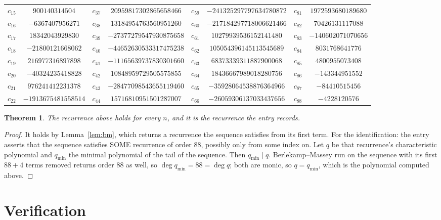 \documentclass[11pt,a4paper]{article}
\theoremstyle{plain}
\newtheorem{theorem}{Theorem}
\theoremstyle{definition}
\begin{document}
\begin{center}
\begin{tabular}{cccccccc}
$c_{15}$ & $900140314504$ & $c_{37}$ & $20959817302865658466$ & $c_{59}$ & $-241325297797634780872$ & $c_{81}$ & $1972593680189680$ \\
$c_{16}$ & $-6367407956271$ & $c_{38}$ & $13184954763560951260$ & $c_{60}$ & $-217184297718006621466$ & $c_{82}$ & $70426131117088$ \\
$c_{17}$ & $18342043929830$ & $c_{39}$ & $-27377279547930875658$ & $c_{61}$ & $10279939536152141480$ & $c_{83}$ & $-140602071070656$ \\
$c_{18}$ & $-21800121668062$ & $c_{40}$ & $-44652630533317475238$ & $c_{62}$ & $105054396145113545689$ & $c_{84}$ & $8031768641776$ \\
$c_{19}$ & $216977316897898$ & $c_{41}$ & $-11165639737830301660$ & $c_{63}$ & $68373339311887900068$ & $c_{85}$ & $4800955073408$ \\
$c_{20}$ & $-40324235418828$ & $c_{42}$ & $10848959729505575855$ & $c_{64}$ & $18436667989018280756$ & $c_{86}$ & $-143344951552$ \\
$c_{21}$ & $976241412231378$ & $c_{43}$ & $-28477098543655119460$ & $c_{65}$ & $-35928064538876364966$ & $c_{87}$ & $-84410515456$ \\
$c_{22}$ & $-1913675481558514$ & $c_{44}$ & $15716810951501287007$ & $c_{66}$ & $-26059306137033437656$ & $c_{88}$ & $-4228120576$ \\
\end{tabular}
\end{center}

\begin{theorem}
The recurrence above holds for every $n$, and it is the recurrence the entry records.
\end{theorem}

\begin{proof}
It holds by Lemma~\ref{lem:bm}, which returns a recurrence the sequence satisfies from its
first term. For the identification: the entry asserts that the sequence satisfies SOME
recurrence of order $88$, possibly only from some index on. Let $q$ be that recurrence's
characteristic polynomial and $q_{\min}$ the minimal polynomial of the tail of the sequence.
Then $q_{\min}\mid q$. Berlekamp--Massey run on the sequence with its first $88+4$ terms
removed returns order $88$ as well, so $\deg q_{\min}=88=\deg q$; both are monic, so
$q=q_{\min}$, which is the polynomial computed above.
\end{proof}

\section{Verification}
\end{document}
